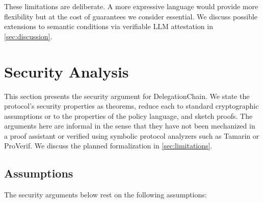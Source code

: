 \documentclass[11pt,a4paper]{article}
\begin{document}
These limitations are deliberate. A more expressive language would
provide more flexibility but at the cost of guarantees we consider
essential. We discuss possible extensions to semantic conditions via
verifiable LLM attestation in \cref{sec:discussion}.

\section{Security Analysis}
\label{sec:security}

This section presents the security argument for DelegationChain. We
state the protocol's security properties as theorems, reduce each to
standard cryptographic assumptions or to the properties of the policy
language, and sketch proofs. The arguments here are informal in the
sense that they have not been mechanized in a proof assistant or
verified using symbolic protocol analyzers such as Tamarin or
ProVerif. We discuss the planned formalization in
\cref{sec:limitations}.

\subsection{Assumptions}
\label{sec:security-assumptions}

The security arguments below rest on the following assumptions:
\end{document}
